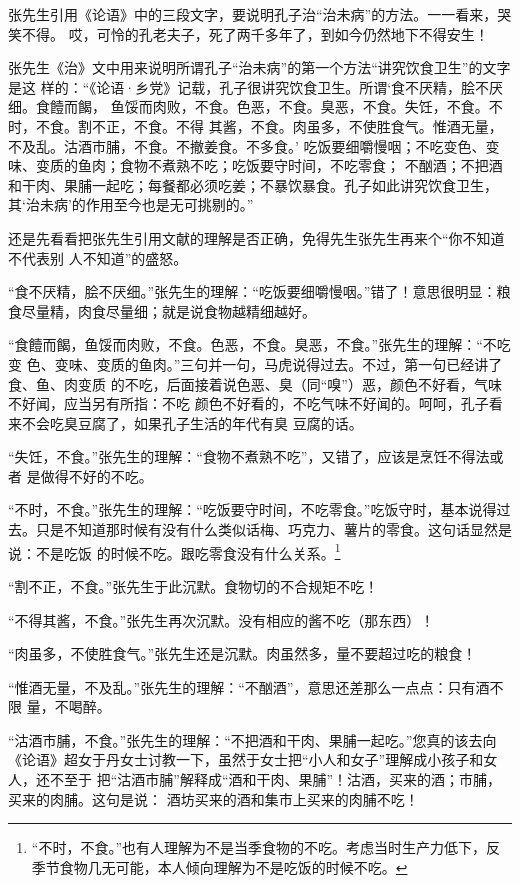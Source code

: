 张先生引用《论语》中的三段文字，要说明孔子治“治未病”的方法。一一看来，哭笑不得。
哎，可怜的孔老夫子，死了两千多年了，到如今仍然地下不得安生！

张先生《治》文中用来说明所谓孔子“治未病”的第一个方法“讲究饮食卫生”的文字是这
样的：“《论语·乡党》记载，孔子很讲究饮食卫生。所谓‘食不厌精，脍不厌细。食饐而餲，
鱼馁而肉败，不食。色恶，不食。臭恶，不食。失饪，不食。不时，不食。割不正，不食。不得
其酱，不食。肉虽多，不使胜食气。惟酒无量，不及乱。沽酒市脯，不食。不撤姜食。不多食。’
吃饭要细嚼慢咽；不吃变色、变味、变质的鱼肉；食物不煮熟不吃；吃饭要守时间，不吃零食；
不酗酒；不把酒和干肉、果脯一起吃；每餐都必须吃姜；不暴饮暴食。孔子如此讲究饮食卫生，
其‘治未病’的作用至今也是无可挑剔的。” 

还是先看看把张先生引用文献的理解是否正确，免得先生张先生再来个“你不知道不代表别
人不知道”的盛怒。

  “食不厌精，脍不厌细。”张先生的理解：“吃饭要细嚼慢咽。”错了！意思很明显：粮
食尽量精，肉食尽量细；就是说食物越精细越好。
  
  “食饐而餲，鱼馁而肉败，不食。色恶，不食。臭恶，不食。”张先生的理解：“不吃变
色、变味、变质的鱼肉。”三句并一句，马虎说得过去。不过，第一句已经讲了食、鱼、肉变质
的不吃，后面接着说色恶、臭（同“嗅”）恶，颜色不好看，气味不好闻，应当另有所指：不吃
颜色不好看的，不吃气味不好闻的。呵呵，孔子看来不会吃臭豆腐了，如果孔子生活的年代有臭
豆腐的话。
  
  “失饪，不食。”张先生的理解：“食物不煮熟不吃”，又错了，应该是烹饪不得法或者
是做得不好的不吃。
  
  “不时，不食。”张先生的理解：“吃饭要守时间，不吃零食。”吃饭守时，基本说得过
去。只是不知道那时候有没有什么类似话梅、巧克力、薯片的零食。这句话显然是说：不是吃饭
的时候不吃。跟吃零食没有什么关系。\footnote{“不时，不食。”也有人理解为不是当季食物的不吃。考虑当时生产力低下，反季节食物几无可能，本人倾向理解为不是吃饭的时候不吃。}
  
  “割不正，不食。”张先生于此沉默。食物切的不合规矩不吃！
  
  “不得其酱，不食。”张先生再次沉默。没有相应的酱不吃（那东西）！
  
  “肉虽多，不使胜食气。”张先生还是沉默。肉虽然多，量不要超过吃的粮食！
  
  “惟酒无量，不及乱。”张先生的理解：“不酗酒”，意思还差那么一点点：只有酒不限
量，不喝醉。
  
  “沽酒市脯，不食。”张先生的理解：“不把酒和干肉、果脯一起吃。”您真的该去向
《论语》超女于丹女士讨教一下，虽然于女士把“小人和女子”理解成小孩子和女人，还不至于
把“沽酒市脯”解释成“酒和干肉、果脯”！沽酒，买来的酒；市脯，买来的肉脯。这句是说：
酒坊买来的酒和集市上买来的肉脯不吃！
  
